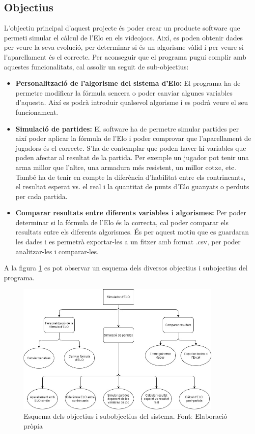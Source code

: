 \documentclass[a4paper]{article}
\begin{document}
\subsection{Objectius}
L'objectiu principal d'aquest projecte és poder crear un producte software que permeti simular el càlcul de l'Elo en els videojocs. Així, es poden obtenir dades per veure la seva evolució, per determinar si és un algorisme vàlid i per veure si l'aparellament és el correcte. Per aconseguir que el programa pugui complir amb aquestes funcionalitats, cal assolir un seguit de sub-objectius:
\begin{itemize}
    \item \textbf{Personalització de l'algorisme del sistema d'Elo:} El programa ha de permetre modificar la fórmula sencera o poder canviar algunes variables d'aquesta. Així es podrà introduir qualsevol algorisme i es podrà veure el seu funcionament.
    
    \item \textbf{Simulació de partides:} El software ha de permetre simular partides per així poder aplicar la fórmula de l'Elo i poder comprovar que l'aparellament de jugadors és el correcte. S'ha de contemplar que poden haver-hi variables que poden afectar al resultat de la partida. Per exemple un jugador pot tenir una arma millor que l'altre, una armadura més resistent, un millor cotxe, etc. També ha de tenir en compte la diferència d'habilitat entre els contrincants, el resultat esperat vs. el real i la quantitat de punts d'Elo guanyats o perduts per cada partida. 
    
    \item \textbf{Comparar resultats entre diferents variables i algorismes:} Per poder determinar si la fórmula de l'Elo és la correcta, cal poder comparar els resultats entre els diferents algorismes. És per aquest motiu que es guardaran les dades i es permetrà exportar-les a un fitxer amb format .csv, per poder analitzar-les i comparar-les.
\end{itemize}

A la figura \ref{fig:EsquemaObjectius} es pot observar un esquema dels diversos objectius i subojectius del programa.

\begin{figure}[H]
    \centering
    \includegraphics[width=0.9\textwidth]{images/FuncionsEsquema.jpg}
    \caption{Esquema dels objectius i subobjectius del sistema. Font: Elaboració pròpia}
    \label{fig:EsquemaObjectius}
\end{figure}
\end{document}

